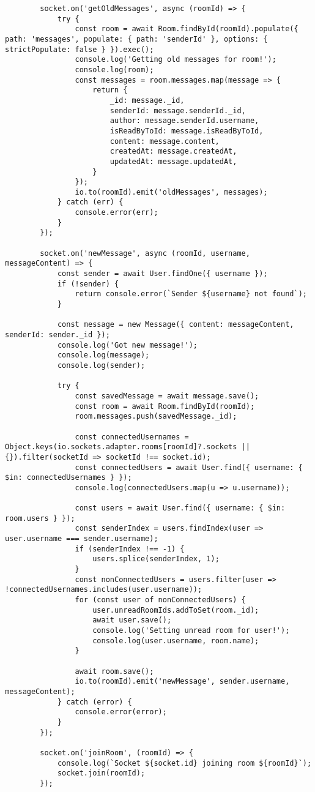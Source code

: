\documentclass{article}
\begin{document}
\begin{normalsize}
\begin{lstlisting}
		socket.on('getOldMessages', async (roomId) => {
			try {
				const room = await Room.findById(roomId).populate({ path: 'messages', populate: { path: 'senderId' }, options: { strictPopulate: false } }).exec();
				console.log('Getting old messages for room!');
				console.log(room);
				const messages = room.messages.map(message => {
					return {
						_id: message._id,
						senderId: message.senderId._id,
						author: message.senderId.username,
						isReadByToId: message.isReadByToId,
						content: message.content,
						createdAt: message.createdAt,
						updatedAt: message.updatedAt,
					}
				});
				io.to(roomId).emit('oldMessages', messages);
			} catch (err) {
				console.error(err);
			}
		});
		
		socket.on('newMessage', async (roomId, username, messageContent) => {
			const sender = await User.findOne({ username });
			if (!sender) {
				return console.error(`Sender ${username} not found`);
			}
			
			const message = new Message({ content: messageContent, senderId: sender._id });
			console.log('Got new message!');
			console.log(message);
			console.log(sender);
			
			try {
				const savedMessage = await message.save();
				const room = await Room.findById(roomId);
				room.messages.push(savedMessage._id);
				
				const connectedUsernames = Object.keys(io.sockets.adapter.rooms[roomId]?.sockets || {}).filter(socketId => socketId !== socket.id);
				const connectedUsers = await User.find({ username: { $in: connectedUsernames } });
				console.log(connectedUsers.map(u => u.username));
				
				const users = await User.find({ username: { $in: room.users } });
				const senderIndex = users.findIndex(user => user.username === sender.username);
				if (senderIndex !== -1) {
					users.splice(senderIndex, 1);
				}
				const nonConnectedUsers = users.filter(user => !connectedUsernames.includes(user.username));
				for (const user of nonConnectedUsers) {
					user.unreadRoomIds.addToSet(room._id);
					await user.save();
					console.log('Setting unread room for user!');
					console.log(user.username, room.name);
				}
				
				await room.save();
				io.to(roomId).emit('newMessage', sender.username, messageContent);
			} catch (error) {
				console.error(error);
			}
		});
		
		socket.on('joinRoom', (roomId) => {
			console.log(`Socket ${socket.id} joining room ${roomId}`);
			socket.join(roomId);
		});
		

\end{lstlisting}
\end{normalsize}
\end{document}
